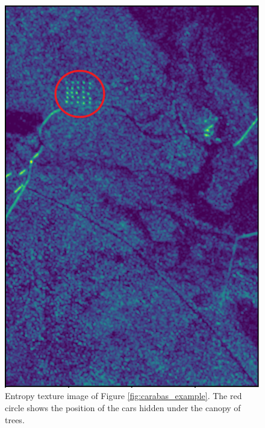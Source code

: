 \begin{figure}[H]
  \centering
  \includegraphics[width=0.8\linewidth]{Cap3-Results/entropy_example.png}
  \caption{Entropy texture image of Figure \ref{fig:carabas_example}.
  The red circle shows the position of the cars hidden under the canopy of trees.}
  \label{fig:entropy_example}
\end{figure}

